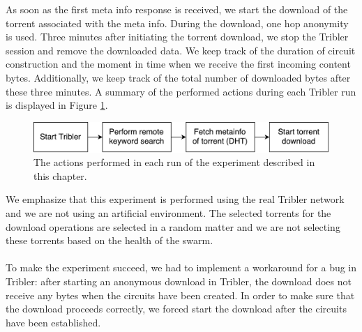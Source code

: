 As soon as the first meta info response is received, we start the download of the torrent associated with the meta info. During the download, one hop anonymity is used. Three minutes after initiating the torrent download, we stop the Tribler session and remove the downloaded data. We keep track of the duration of circuit construction and the moment in time when we receive the first incoming content bytes. Additionally, we keep track of the total number of downloaded bytes after these three minutes. A summary of the performed actions during each Tribler run is displayed in Figure \ref{fig:big-experiment-setup}.\\

\begin{figure}[!h]
	\centering
	\includegraphics[width=0.7\columnwidth]{images/big_experiment/big_experiment_setup}
	\caption{The actions performed in each run of the experiment described in this chapter.}
	\label{fig:big-experiment-setup}
\end{figure}

We emphasize that this experiment is performed using the real Tribler network and we are not using an artificial environment. The selected torrents for the  download operations are selected in a random matter and we are not selecting these torrents based on the health of the swarm.\\\\
To make the experiment succeed, we had to implement a workaround for a bug in Tribler: after starting an anonymous download in Tribler, the download does not receive any bytes when the circuits have been created. In order to make sure that the download proceeds correctly, we forced start the download after the circuits have been established.

